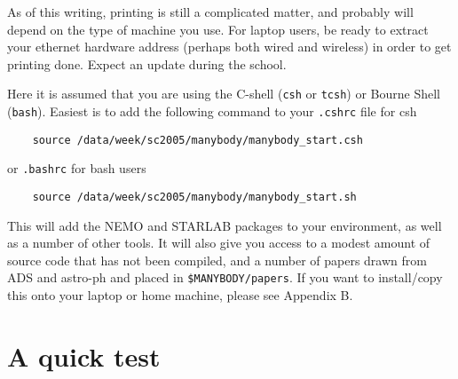 As of this writing, printing is still a complicated matter, and probably 
will depend on the type
of machine you use. For laptop users, be ready to extract your ethernet hardware
address (perhaps both wired and wireless) in order to get printing done.
Expect an update during the school.

Here it is assumed that you are using 
the C-shell ({\tt csh} or {\tt tcsh}) or Bourne Shell  ({\tt bash}).
Easiest is to add the following  command to your {\tt .cshrc} file
for csh

\begin{verbatim}
    source /data/week/sc2005/manybody/manybody_start.csh
\end{verbatim}
or {\tt .bashrc} for bash users
\begin{verbatim}
    source /data/week/sc2005/manybody/manybody_start.sh
\end{verbatim}

This will add the NEMO and STARLAB packages to your environment, as well as
a number of other tools. It will also give you access to
a modest amount of source code that has not been compiled, and a number
of papers drawn from ADS and astro-ph and placed in {\tt \$MANYBODY/papers}.
If you want to install/copy this onto your laptop or home machine, please
see Appendix B.

\section{A quick test}


